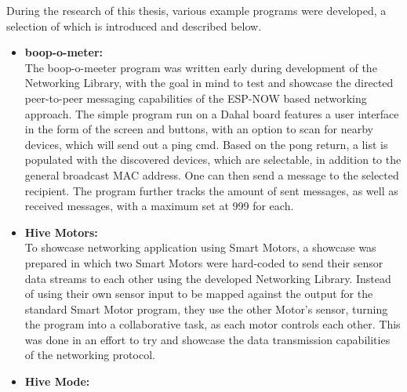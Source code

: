 During the research of this thesis, various example programs were developed, a selection of which is introduced and described below. 
\begin{itemize}
    \item \textbf{boop-o-meter:}\\
    The boop-o-meeter program was written early during development of the Networking Library, with the goal in mind to test and showcase the directed peer-to-peer messaging capabilities of the ESP-NOW based networking approach. The simple program run on a Dahal board features a user interface in the form of the screen and buttons, with an option to scan for nearby devices, which will send out a ping cmd. Based on the pong return, a list is populated with the discovered devices, which are selectable, in addition to the general broadcast MAC address. One can then send a message to the selected recipient. The program further tracks the amount of sent messages, as well as received messages, with a maximum set at 999 for each.
    \item \textbf{Hive Motors:}\\
    To showcase networking application using Smart Motors, a showcase was prepared in which two Smart Motors were hard-coded to send their sensor data streams to each other using the developed Networking Library. Instead of using their own sensor input to be mapped against the output for the standard Smart Motor program, they use the other Motor's sensor, turning the program into a collaborative task, as each motor controls each other. This was done in an effort to try and showcase the data transmission capabilities of the networking protocol.
    \item \textbf{Hive Mode:}\\

\end{itemize}
